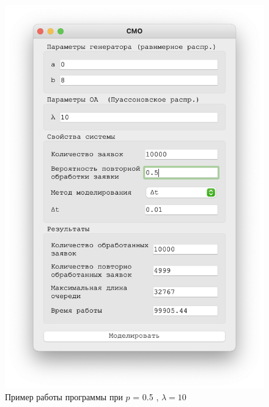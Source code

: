 \begin{figure}[!htb]
\begin{minipage}{0.55\textwidth}
      \includegraphics[width=1\linewidth]{10-50-t}
    \end{minipage}
    \caption{Пример работы программы при $p$ = 0.5 , $\lambda = 10$}
 \end{figure}

